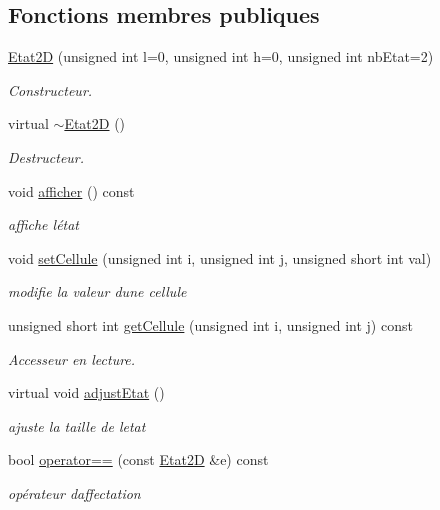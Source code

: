 \subsection*{Fonctions membres publiques}
\begin{DoxyCompactItemize}
\item 
\hyperlink{class_etat2_d_aae67a6ba3b3b3726a9533f647d34dd55}{Etat2D} (unsigned int l=0, unsigned int h=0, unsigned int nb\+Etat=2)
\begin{DoxyCompactList}\small\item\em Constructeur. \end{DoxyCompactList}\item 
virtual \hyperlink{class_etat2_d_ab16143bd296cf929a9968400831b1a95}{$\sim$\+Etat2D} ()
\begin{DoxyCompactList}\small\item\em Destructeur. \end{DoxyCompactList}\item 
void \hyperlink{class_etat2_d_a6fa30b43d2971b01cbfb59aef094aded}{afficher} () const 
\begin{DoxyCompactList}\small\item\em affiche l\textquotesingle{}état \end{DoxyCompactList}\item 
void \hyperlink{class_etat2_d_a96f855c00941ce59b2c84d347dfb5e1c}{set\+Cellule} (unsigned int i, unsigned int j, unsigned short int val)
\begin{DoxyCompactList}\small\item\em modifie la valeur d\textquotesingle{}une cellule \end{DoxyCompactList}\item 
unsigned short int \hyperlink{class_etat2_d_adfe7448075788e3cd17c0b7df50b9438}{get\+Cellule} (unsigned int i, unsigned int j) const 
\begin{DoxyCompactList}\small\item\em Accesseur en lecture. \end{DoxyCompactList}\item 
virtual void \hyperlink{class_etat2_d_af99e5b4041ce363a4b1e96a6751719d5}{adjust\+Etat} ()
\begin{DoxyCompactList}\small\item\em ajuste la taille de l\textquotesingle{}etat \end{DoxyCompactList}\item 
bool \hyperlink{class_etat2_d_a6834241d99725640691eb3a252d14f5a}{operator==} (const \hyperlink{class_etat2_d}{Etat2D} \&e) const 
\begin{DoxyCompactList}\small\item\em opérateur d\textquotesingle{}affectation \end{DoxyCompactList}\end{DoxyCompactItemize}
